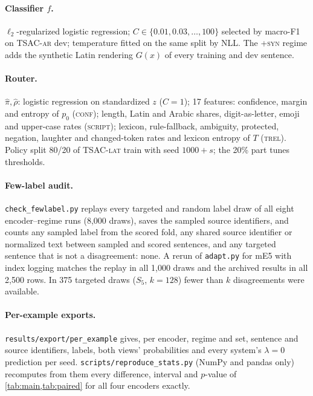 \paragraph{Classifier $f$.} $\ell_2$-regularized logistic regression; $C\in\{0.01,0.03,\ldots,100\}$ selected by macro-F1 on TSAC-\textsc{ar} dev; temperature fitted on the same split by NLL. The \textsc{+syn} regime adds the synthetic Latin rendering $G(x)$ of every training and dev sentence.

\paragraph{Router.} $\hat\pi,\hat\rho$: logistic regression on standardized $z$ ($C=1$); 17 features: confidence, margin and entropy of $p_0$ (\textsc{conf}); length, Latin and Arabic shares, digit-as-letter, emoji and upper-case rates (\textsc{script}); lexicon, rule-fallback, ambiguity, protected, negation, laughter and changed-token rates and lexicon entropy of $T$ (\textsc{trel}). Policy split 80/20 of TSAC-\textsc{lat} train with seed $1000+s$; the 20\% part tunes thresholds. 

\paragraph{Few-label audit.} \texttt{check\_fewlabel.py} replays every targeted and random label draw of all eight encoder--regime runs (8{,}000 draws), saves the sampled source identifiers, and counts any sampled label from the scored fold, any shared source identifier or normalized text between sampled and scored sentences, and any targeted sentence that is not a disagreement: none. A rerun of \texttt{adapt.py} for mE5 with index logging matches the replay in all 1{,}000 draws and the archived results in all 2{,}500 rows. In 375 targeted draws ($S_5$, $k{=}128$) fewer than $k$ disagreements were available.

\paragraph{Per-example exports.} \texttt{results/export/per\_example} gives, per encoder, regime and set, sentence and source identifiers, labels, both views' probabilities and every system's $\lambda{=}0$ prediction per seed. \texttt{scripts/reproduce\_stats.py} (NumPy and pandas only) recomputes from them every difference, interval and $p$-value of \cref{tab:main,tab:paired} for all four encoders exactly.

